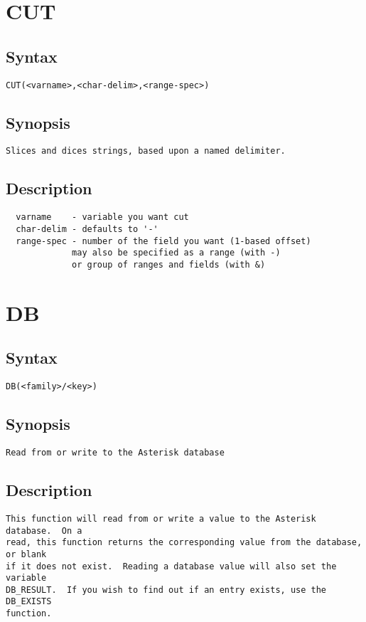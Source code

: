 \section{CUT}
\subsection{Syntax}
\begin{verbatim}
CUT(<varname>,<char-delim>,<range-spec>)
\end{verbatim}
\subsection{Synopsis}
\begin{verbatim}
Slices and dices strings, based upon a named delimiter.
\end{verbatim}
\subsection{Description}
\begin{verbatim}
  varname    - variable you want cut
  char-delim - defaults to '-'
  range-spec - number of the field you want (1-based offset)
             may also be specified as a range (with -)
             or group of ranges and fields (with &)

\end{verbatim}


\section{DB}
\subsection{Syntax}
\begin{verbatim}
DB(<family>/<key>)
\end{verbatim}
\subsection{Synopsis}
\begin{verbatim}
Read from or write to the Asterisk database
\end{verbatim}
\subsection{Description}
\begin{verbatim}
This function will read from or write a value to the Asterisk database.  On a
read, this function returns the corresponding value from the database, or blank
if it does not exist.  Reading a database value will also set the variable
DB_RESULT.  If you wish to find out if an entry exists, use the DB_EXISTS
function.

\end{verbatim}


